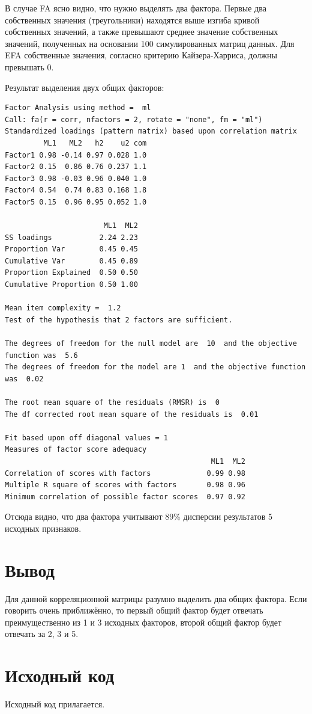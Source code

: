 \documentclass{article} %
\begin{document}
В случае FA ясно видно, что нужно выделять два фактора.
Первые два собственных значения (треугольники) находятся выше изгиба
кривой собственных значений, а также превышают среднее значение
собственных значений, полученных на основании 100 симулированных матриц данных.
Для EFA собственные значения, согласно критерию Кайзера-Харриса, должны превышать 0.

Результат выделения двух общих факторов:

\begin{lstlisting}
Factor Analysis using method =  ml
Call: fa(r = corr, nfactors = 2, rotate = "none", fm = "ml")
Standardized loadings (pattern matrix) based upon correlation matrix
         ML1   ML2   h2    u2 com
Factor1 0.98 -0.14 0.97 0.028 1.0
Factor2 0.15  0.86 0.76 0.237 1.1
Factor3 0.98 -0.03 0.96 0.040 1.0
Factor4 0.54  0.74 0.83 0.168 1.8
Factor5 0.15  0.96 0.95 0.052 1.0

                       ML1  ML2
SS loadings           2.24 2.23
Proportion Var        0.45 0.45
Cumulative Var        0.45 0.89
Proportion Explained  0.50 0.50
Cumulative Proportion 0.50 1.00

Mean item complexity =  1.2
Test of the hypothesis that 2 factors are sufficient.

The degrees of freedom for the null model are  10  and the objective function was  5.6
The degrees of freedom for the model are 1  and the objective function was  0.02 

The root mean square of the residuals (RMSR) is  0 
The df corrected root mean square of the residuals is  0.01 

Fit based upon off diagonal values = 1
Measures of factor score adequacy             
                                                ML1  ML2
Correlation of scores with factors             0.99 0.98
Multiple R square of scores with factors       0.98 0.96
Minimum correlation of possible factor scores  0.97 0.92
\end{lstlisting}

Отсюда видно, что два фактора учитывают 89\%
дисперсии результатов 5 исходных признаков.

\section*{Вывод}
Для данной корреляционной матрицы разумно выделить два общих фактора.
Если говорить очень приближённо,
то первый общий фактор будет отвечать
преимущественно из 1 и 3 исходных факторов,
второй общий фактор будет отвечать за 2, 3 и 5.

\section*{Исходный код}
Исходный код прилагается.
\end{document}
